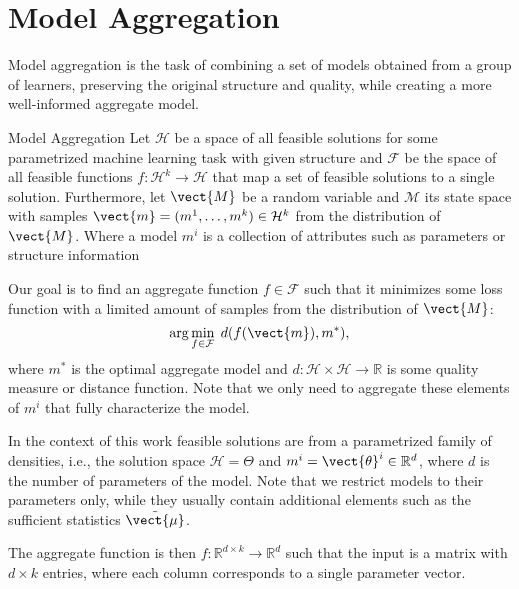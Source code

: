 
\chapter{Model Aggregation}
\label{chapter:ch3}
Model aggregation is the task of combining a set of models obtained from a group of learners, preserving the original structure and quality, while creating a more well-informed aggregate model.
\begin{definition}[parbox=false]{Model Aggregation}
    Let $\mathcal{H}$ be a space of all feasible solutions for some parametrized machine learning task with given structure and $\mathcal{F}$ be the space of all feasible functions $f: \mathcal{H}^k \rightarrow \mathcal{H}$ that map a set of feasible solutions to a single solution.
    Furthermore, let $\vect{M}$ be a random variable and $\mathcal{M}$ its state space with samples  $\vect{m} = (m^1, \ldots, m^k) \in \mathcal{H}^k$ from the distribution of $\vect{M}$.
    Where a model $m^i$ is a collection of attributes such as parameters or structure information

    Our goal is to find an aggregate function $f \in \mathcal{F}$ such that it minimizes some loss function with a limited amount of samples from the distribution of $\vect{M}$:
    \begin{equation}
        \label{eq:regret}
        \arg\min_{f \in \mathcal{F}} \; d(f(\vect{m}), m^*),
    \end{equation}
    where $m^*$ is the optimal aggregate model and $d: \mathcal{H} \times \mathcal{H} \rightarrow \mathbb{R}$ is some quality measure or distance function.
    Note that we only need to aggregate these elements of $m^i$ that fully characterize the model.
\end{definition}

In the context of this work feasible solutions are from a parametrized family of densities, i.e., the solution space $\mathcal{H} = \Theta$ and  $m^i = \vect{\theta}^i \in \mathbb{R}^d$, where $d$ is the number of parameters of the model. 
Note that we restrict models to their parameters only, while they usually contain additional elements such as the sufficient statistics $\tilde{\vect{\mu}}$.

The aggregate function is then $f: \mathbb{R}^{d \times k} \rightarrow \mathbb{R}^{d}$ such that the input is a matrix with $d \times k$ entries, where each column corresponds to a single parameter vector.

